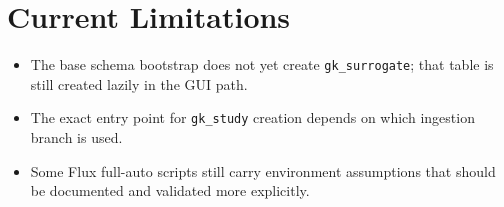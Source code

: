 \documentclass[11pt]{article}
\newcommand{\code}[1]{\texttt{#1}}
\begin{document}
\section{Current Limitations}

\begin{itemize}
\item The base schema bootstrap does not yet create \code{gk\_surrogate}; that
table is still created lazily in the GUI path.
\item The exact entry point for \code{gk\_study} creation depends on which
ingestion branch is used.
\item Some Flux full-auto scripts still carry environment assumptions that
should be documented and validated more explicitly.
\end{itemize}
\end{document}
